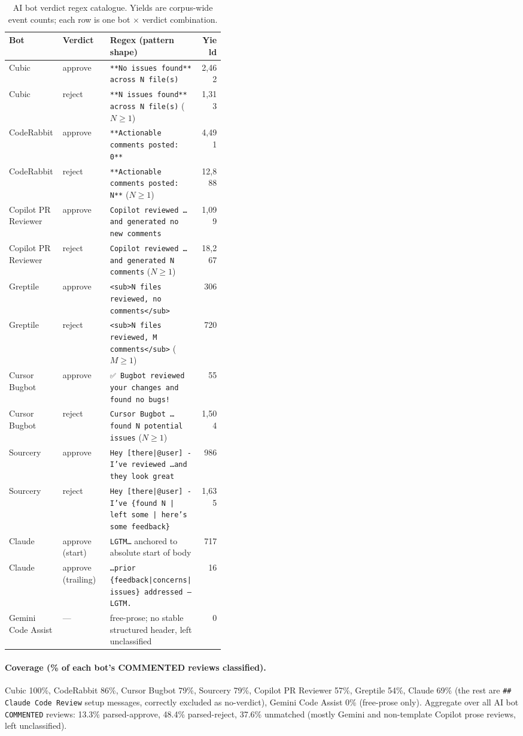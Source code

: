 \begin{table}[t]
\centering\footnotesize
\caption{AI bot verdict regex catalogue. Yields are corpus-wide event counts; each row is one bot $\times$ verdict combination.}
\label{tab:ai-verdict-regex}
\begin{tabular}{@{}llp{0.42\linewidth}r@{}}
\toprule
Bot & Verdict & Regex (pattern shape) & Yield \\
\midrule
Cubic & approve & \texttt{**No issues found** across N file(s)} & 2,462 \\
Cubic & reject  & \texttt{**N issues found** across N file(s)} ($N\geq 1$) & 1,313 \\
CodeRabbit & approve & \texttt{**Actionable comments posted: 0**} & 4,491 \\
CodeRabbit & reject  & \texttt{**Actionable comments posted: N**} ($N\geq 1$) & 12,888 \\
Copilot PR Reviewer & approve & \texttt{Copilot reviewed \dots and generated no new comments} & 1,099 \\
Copilot PR Reviewer & reject  & \texttt{Copilot reviewed \dots and generated N comments} ($N\geq 1$) & 18,267 \\
Greptile & approve & \texttt{<sub>N files reviewed, no comments</sub>} & 306 \\
Greptile & reject  & \texttt{<sub>N files reviewed, M comments</sub>} ($M\geq 1$) & 720 \\
Cursor Bugbot & approve & \texttt{✅ Bugbot reviewed your changes and found no bugs!} & 55 \\
Cursor Bugbot & reject  & \texttt{Cursor Bugbot \dots found N potential issues} ($N\geq 1$) & 1,504 \\
Sourcery & approve & \texttt{Hey [there|@user] - I've reviewed \dots and they look great} & 986 \\
Sourcery & reject  & \texttt{Hey [there|@user] - I've \{found N | left some | here's some feedback\}} & 1,635 \\
Claude & approve (start) & \texttt{LGTM\dots} anchored to absolute start of body & 717 \\
Claude & approve (trailing) & \texttt{\dots prior \{feedback|concerns|issues\} addressed --- LGTM.} & 16 \\
Gemini Code Assist & --- & free-prose; no stable structured header, left unclassified & 0 \\
\bottomrule
\end{tabular}
\end{table}

\paragraph{Coverage (\% of each bot's COMMENTED reviews classified).} Cubic 100\%, CodeRabbit 86\%, Cursor Bugbot 79\%, Sourcery 79\%, Copilot PR Reviewer 57\%, Greptile 54\%, Claude 69\% (the rest are \texttt{\#\# Claude Code Review} setup messages, correctly excluded as no-verdict), Gemini Code Assist 0\% (free-prose only). Aggregate over all AI bot \texttt{COMMENTED} reviews: 13.3\% parsed-approve, 48.4\% parsed-reject, 37.6\% unmatched (mostly Gemini and non-template Copilot prose reviews, left unclassified).
